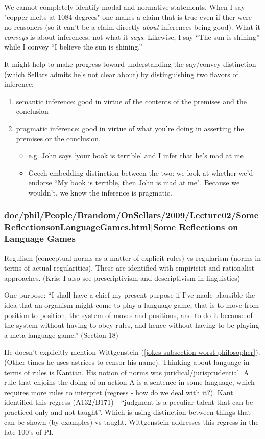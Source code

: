 \documentclass[12pt,a4paper]{report}
\begin{document}
We cannot completely identify modal and normative statements. When I say "copper melts at 1084 degrees" one makes a claim that is true even if ther were no reasoners (so it can't be a claim directly \emph{about} inferences being good). What it \emph{conveys} is about inferences, not what it \emph{says}. Likewise, I say ``The sun is shining'' while I convey ``I believe the sun is shining.''

It might help to make progress toward understanding the say/convey distinction (which Sellars admits he's not clear about) by distinguishing two flavors of inference:
\begin{enumerate}
\item semantic inference: good in virtue of the contents of the premises and the conclusion
\item pragmatic inference: good in virtue of what you're doing in asserting the premises or the conclusion.
 \begin{itemize}
 \item e.g. John says `your book is terrible' and I infer that he's mad at me
 \item Geech embedding distinction between the two: we look at whether we'd endorse ``My book is terrible, then John is mad at me". Because we wouldn't, we know the inference is pragmatic.

 \end{itemize}
\end{enumerate}
\subsubsection{doc/phil/People/Brandom/OnSellars/2009/Lecture02/SomeReflectionsonLanguageGames.html|Some Reflections on Language Games}

Regulism (conceptual norms as a matter of explicit rules) vs regularism (norms in terms of actual regularities). These are identified with empiricist and rationalist approaches. (Kris: I also see prescriptivism and descriptivism in linguistics)

One purpose: ``I shall have a chief my present purpose if I've made plausible the idea that an organism might come to play a language game, that is to move from position to position, the system of moves and positions, and to do it because of the system without having to obey rules, and hence without having to be playing a meta language game.'' (Section 18)

He doesn't explicitly mention Wittgenstein (\ref{jokes-subsection-worst-philosopher}). (Other times he uses astrices to censor his name). Thinking about language in terms of rules is Kantian. His notion of norms was juridical/jurisprudential. A rule that enjoins the doing of an action A is a sentence in some language, which requires more rules to interpret (regress - how do we deal with it?). Kant identified this regress (A132/B171) - ``judgment is a peculiar talent that can be practiced only and not taught''. Which is using distinction between things that can be shown (by examples) vs taught. Wittgenstein addresses this regress in the late 100's of PI.
\end{document}
